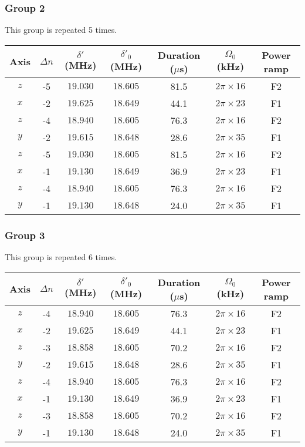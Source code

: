 \subsubsection{Group 2}
This group is repeated 5 times.
\begin{center}
  \begin{tabular}{|c|c|c|c|c|c|c|}
    \hline
    Axis&$\Delta n$&$\delta'$ (MHz)&$\delta'_0$ (MHz)&Duration ($\mu$s)& $\Omega_0$ (kHz)&Power ramp\\\hline
    $z$&-5&$19.030$&$18.605$&81.5&$2\pi\times16$&F2\\\hline
    $x$&-2&$19.625$&$18.649$&44.1&$2\pi\times23$&F1\\\hline
    $z$&-4&$18.940$&$18.605$&76.3&$2\pi\times16$&F2\\\hline
    $y$&-2&$19.615$&$18.648$&28.6&$2\pi\times35$&F1\\\hline
    $z$&-5&$19.030$&$18.605$&81.5&$2\pi\times16$&F2\\\hline
    $x$&-1&$19.130$&$18.649$&36.9&$2\pi\times23$&F1\\\hline
    $z$&-4&$18.940$&$18.605$&76.3&$2\pi\times16$&F2\\\hline
    $y$&-1&$19.130$&$18.648$&24.0&$2\pi\times35$&F1\\\hline
  \end{tabular}
\end{center}
\subsubsection{Group 3}
This group is repeated 6 times.
\begin{center}
  \begin{tabular}{|c|c|c|c|c|c|c|}
    \hline
    Axis&$\Delta n$&$\delta'$ (MHz)&$\delta'_0$ (MHz)&Duration ($\mu$s)& $\Omega_0$ (kHz)&Power ramp\\\hline
    $z$&-4&$18.940$&$18.605$&76.3&$2\pi\times16$&F2\\\hline
    $x$&-2&$19.625$&$18.649$&44.1&$2\pi\times23$&F1\\\hline
    $z$&-3&$18.858$&$18.605$&70.2&$2\pi\times16$&F2\\\hline
    $y$&-2&$19.615$&$18.648$&28.6&$2\pi\times35$&F1\\\hline
    $z$&-4&$18.940$&$18.605$&76.3&$2\pi\times16$&F2\\\hline
    $x$&-1&$19.130$&$18.649$&36.9&$2\pi\times23$&F1\\\hline
    $z$&-3&$18.858$&$18.605$&70.2&$2\pi\times16$&F2\\\hline
    $y$&-1&$19.130$&$18.648$&24.0&$2\pi\times35$&F1\\\hline
  \end{tabular}
\end{center}

